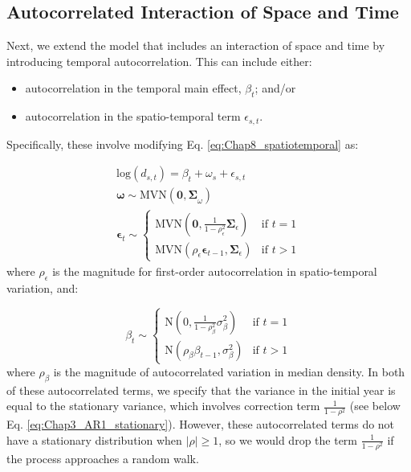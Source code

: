 \subsection{Autocorrelated Interaction of Space and Time}

Next, we extend the model that includes an interaction of space and time by introducing temporal autocorrelation.  This can include either:
\begin{itemize}
    \item autocorrelation in the temporal main effect, \( \beta_t \); and/or

    \item autocorrelation in the spatio-temporal term \( \epsilon_{s,t} \).
\end{itemize}
Specifically, these involve modifying Eq. \ref{eq:Chap8_spatiotemporal} as:

\begin{equation}
\begin{gathered} \label{eq:Chap8_spatiotemporal_AR}
  \mathrm{log}( d_{s,t} ) = \beta_t + \omega_s + \epsilon_{s,t} \\
  \mathbf{\omega} \sim \mathrm{MVN}( \mathbf{0, \Sigma}_{\omega} ) \\
  \mathbf{\epsilon}_t \sim 
  \begin{cases}
    \mathrm{MVN}\left( \mathbf{0}, \frac{1}{1-\rho_{\epsilon}^2} \mathbf{\Sigma}_{\epsilon} \right) & \text{if } t=1 \\ 
    \mathrm{MVN}( \rho_{\epsilon} \mathbf{\epsilon}_{t-1}, \mathbf{\Sigma}_{\epsilon} ) & \text{if } t>1 
  \end{cases}
\end{gathered}
\end{equation}
where \( \rho_{\epsilon} \) is the magnitude for first-order autocorrelation in spatio-temporal variation, and: 

\begin{equation} \label{eq:Chap8_temporal}
  \beta_t \sim 
  \begin{cases}
    \mathrm{N}\left( 0, \frac{1}{1-\rho_{\beta}^2} \sigma_{\beta}^2 \right) & \text{if } t=1 \\
    \mathrm{N}( \rho_{\beta} \beta_{t-1}, \sigma_{\beta}^2 ) & \text{if } t>1
  \end{cases}
\end{equation}
where \( \rho_{\beta} \) is the magnitude of autocorrelated variation in median density.  In both of these autocorrelated terms, we specify that the variance in the initial year is equal to the stationary variance, which involves correction term \( \frac{1}{1-\rho^2} \) (see below Eq. \ref{eq:Chap3_AR1_stationary}).  However, these autocorrelated terms do not have a stationary distribution when \( \lvert \rho \rvert \geq 1 \), so we would drop the term \( \frac{1}{1-\rho^2} \) if the process approaches a random walk.    

